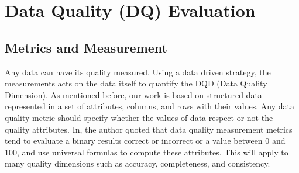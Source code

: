 \chapter{Data Quality (DQ) Evaluation}

\ifpdf
    \graphicspath{{Chapter3/Figs/Raster/}{Chapter3/Figs/PDF/}{Chapter3/Figs/}}
\else
    \graphicspath{{Chapter3/Figs/Vector/}{Chapter3/Figs/}}
\fi

\section{Metrics and Measurement}
Any data can have its quality measured. Using a data driven strategy, the measurements acts on the data itself to quantify the DQD (Data Quality Dimension). 
As mentioned before, our work is based on structured data represented in \cite{Juddoo} a set of attributes, columns, and rows with their values. Any data quality metric should specify whether the values of data respect or not the quality attributes. In, the author quoted that data quality measurement metrics tend to evaluate a
binary results correct or incorrect or a value between 0 and 100, and use universal formulas to
compute these attributes. This will apply to many quality dimensions such as accuracy, completeness, and consistency.
 
